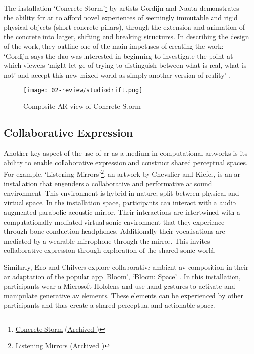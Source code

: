 The installation `Concrete Storm'\footnote{\href{https://studiodrift.com/work/concrete-storm/}{Concrete Storm} \href{https://archive.today/9Yjo1}{(Archived \faArchive)}} by artists Gordijn and Nauta demonstrates the ability for \gls{ar} to afford novel experiences of seemingly immutable and rigid physical objects (short concrete pillars), through the extension and animation of the concrete into larger, shifting and breaking structures. In describing the design of the work, they outline one of the main impetuses of creating the work: `Gordijn says the duo was interested in beginning to investigate the point at which viewers `might let go of trying to distinguish between what is real, what is not' and accept this new mixed world as simply another version of reality' \citep{gottschalk2017}. 

\begin{figure}[ht]
    \centering
    \texttt{[image: 02-review/studiodrift.png]}
    \captionsetup{justification=centering,margin=1.5cm}
    \caption{Composite AR view of Concrete Storm \citep[from][]{gordijn2017}}
\end{figure}\label{fig: concretestorm}

\subsection{Collaborative Expression}\label{sec: ar-arts-collaboration}
Another key aspect of the use of \gls{ar} as a medium in computational artworks is its ability to enable collaborative expression and construct shared perceptual spaces. For example, `Listening Mirrors'\footnote{\href{https://users.sussex.ac.uk/~cc293/listeningmirrors/}{Listening Mirrors} \href{https://archive.today/W9Ecl}{(Archived \faArchive)}}, an artwork by Chevalier and Kiefer, \citeyearpar{chevalier2018} is an \gls{ar} installation that engenders a collaborative and performative \gls{ar} sound environment. This environment is hybrid in nature; split between physical and virtual space. In the installation space, participants can interact with a audio augmented parabolic acoustic mirror. Their interactions are intertwined with a computationally mediated virtual sonic environment that they experience through bone conduction headphones. Additionally their vocalisations are mediated by a wearable microphone through the mirror. This invites collaborative expression through exploration of the shared sonic world.

Similarly, Eno and Chilvers explore collaborative ambient \gls{av} composition in their \gls{ar} adaptation of the popular app `Bloom', `Bloom: Space' \citeyearpar{eno2018}. In this installation, participants wear a Microsoft Hololens and use hand gestures to activate and manipulate generative \gls{av} elements. These elements can be experienced by other participants and thus create a shared perceptual and actionable space.

